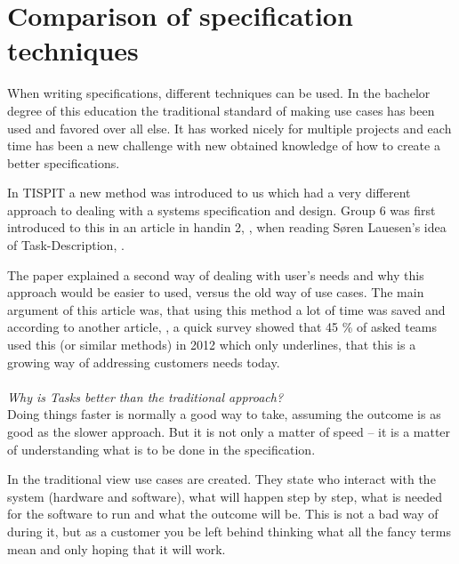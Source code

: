 \documentclass[Main]{subfiles}
\begin{document}
\section{Comparison of specification techniques}


When writing specifications, different techniques can be used.
In the bachelor degree of this education the traditional standard of making use cases has been used and favored over all else.
It has worked nicely for multiple projects and each time has been a new challenge with new obtained knowledge of how to create a better specifications.

In TISPIT a new method was introduced to us which had a very different approach to dealing with a systems specification and design.
Group 6 was first introduced to this in an article in handin 2, \parencite[]{HI2}, when reading Søren Lauesen's idea of Task-Description, \parencite[]{Task}.

The paper explained a second way of dealing with user's needs and why this approach would be easier to used, versus the old way of use cases.
The main argument of this article was, that using this method a lot of time was saved and according to another article, \parencite[]{Task2}, a quick survey showed that 45 \% of asked teams used this (or similar methods) in 2012 which only underlines, that this is a growing way of addressing customers needs today.
\\
\\
\textit{Why is Tasks better than the traditional approach?}
\\
Doing things faster is normally a good way to take, assuming the outcome is as good as the slower approach.
But it is not only a matter of speed -- it is a matter of understanding what is to be done in the specification.

In the traditional view use cases are created.
They state who interact with the system (hardware and software), what will happen step by step, what is needed for the software to run and what the outcome will be.
This is not a bad way of during it, but as a customer you be left behind thinking what all the fancy terms mean and only hoping that it will work.
\end{document}
